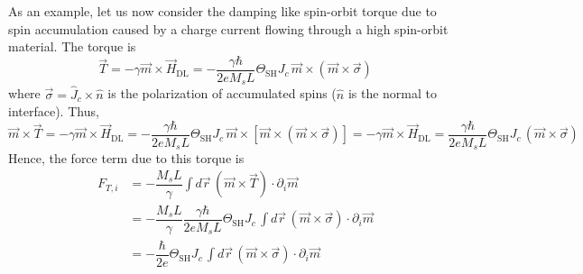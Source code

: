\documentclass[aps,prb,onecolumn,notitlepage,showpacs,floatfix,superscriptaddress]{revtex4-1}
\newcommand{\mrm}[1]{\mathrm{#1}}
\begin{document}
As an example, let us now consider the damping like spin-orbit torque due to spin accumulation caused by a charge current flowing through a high spin-orbit material. The torque is
\begin{equation}
\vec{T} = -\gamma \vec{m} \times \vec{H}_\mrm{DL} = -\dfrac{\gamma \hbar}{2 e M_s L} \Theta_\mrm{SH} J_c \, \vec{m} \times (\vec{m} \times \vec{\sigma})
\end{equation}
where $\vec{\sigma} = \hat{J}_c \times \hat{n}$ is the polarization of accumulated spins ($\hat{n}$ is the normal to interface). Thus,
\begin{equation}
\vec{m} \times \vec{T} = -\gamma \vec{m} \times \vec{H}_\mrm{DL} = -\dfrac{\gamma \hbar}{2 e M_s L} \Theta_\mrm{SH} J_c \, \vec{m} \times [\vec{m} \times (\vec{m} \times \vec{\sigma})] = -\gamma \vec{m} \times \vec{H}_\mrm{DL} =\dfrac{\gamma \hbar}{2 e M_s L} \Theta_\mrm{SH} J_c \,  (\vec{m} \times \vec{\sigma})
\end{equation}
Hence, the force term due to this torque is
\begin{equation}
\begin{split}
F_{T,i} &= -\dfrac{M_s L}{\gamma} \int d\vec{r}\, (\vec{m} \times \vec{T}) \cdot \partial_i \vec{m} \\
&= -\dfrac{M_s L}{\gamma} \dfrac{\gamma \hbar}{2 e M_s L} \Theta_\mrm{SH} J_c \, \int d\vec{r}\, (\vec{m} \times \vec{\sigma}) \cdot \partial_i \vec{m} \\
&= -\dfrac{\hbar}{2 e} \Theta_\mrm{SH} J_c \, \int d\vec{r}\, (\vec{m} \times \vec{\sigma}) \cdot \partial_i \vec{m} \\
\end{split}
\end{equation}
\end{document}
